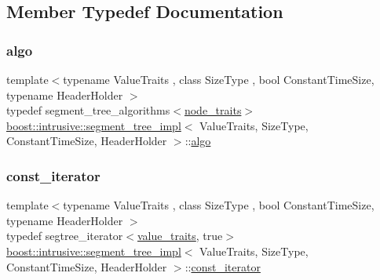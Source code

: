 \subsection{Member Typedef Documentation}
\mbox{\label{classboost_1_1intrusive_1_1segment__tree__impl_a826a6c90baa684755f5035b74683e762}} 
\subsubsection{\texorpdfstring{algo}{algo}}
{\footnotesize\ttfamily template$<$typename Value\+Traits , class Size\+Type , bool Constant\+Time\+Size, typename Header\+Holder $>$ \\
typedef segment\+\_\+tree\+\_\+algorithms$<$\hyperlink{classboost_1_1intrusive_1_1segment__tree__impl_a4530e7ef515902af7c906bbe0c6bb5f2}{node\+\_\+traits}$>$ \hyperlink{classboost_1_1intrusive_1_1segment__tree__impl}{boost\+::intrusive\+::segment\+\_\+tree\+\_\+impl}$<$ Value\+Traits, Size\+Type, Constant\+Time\+Size, Header\+Holder $>$\+::\hyperlink{classboost_1_1intrusive_1_1segment__tree__impl_a826a6c90baa684755f5035b74683e762}{algo}}

\mbox{\label{classboost_1_1intrusive_1_1segment__tree__impl_a6957e501101f1d5427f611f6ee8d1ded}} 
\subsubsection{\texorpdfstring{const\+\_\+iterator}{const\_iterator}}
{\footnotesize\ttfamily template$<$typename Value\+Traits , class Size\+Type , bool Constant\+Time\+Size, typename Header\+Holder $>$ \\
typedef segtree\+\_\+iterator$<$\hyperlink{classboost_1_1intrusive_1_1segment__tree__impl_a929c1b3f1e6bb851a911b9b54a4c0dc2}{value\+\_\+traits}, true$>$ \hyperlink{classboost_1_1intrusive_1_1segment__tree__impl}{boost\+::intrusive\+::segment\+\_\+tree\+\_\+impl}$<$ Value\+Traits, Size\+Type, Constant\+Time\+Size, Header\+Holder $>$\+::\hyperlink{classboost_1_1intrusive_1_1segment__tree__impl_a6957e501101f1d5427f611f6ee8d1ded}{const\+\_\+iterator}}

